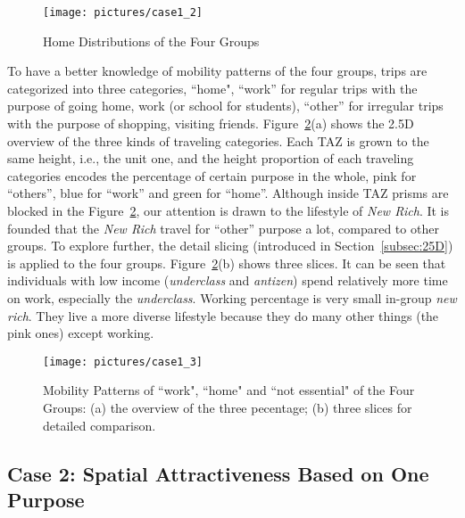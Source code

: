 \begin{figure}[htb!]
 \centering %
 \texttt{[image: pictures/case1\_2]}
 \caption{Home Distributions of the Four Groups}
 \label{case12}
\end{figure}

To have a better knowledge of mobility patterns of the four groups, trips are categorized into three categories, ``home", ``work'' for regular trips with the purpose of going home, work (or school for students), ``other'' for irregular trips with the purpose of shopping, visiting friends. Figure~\ref{case13}(a) shows the 2.5D overview of the three kinds of traveling categories. Each TAZ is grown to the same height, i.e., the unit one, and the height proportion of each traveling categories encodes the percentage of certain purpose in the whole, pink for ``others'', blue for ``work'' and green for ``home''. Although inside TAZ prisms are blocked in the Figure~\ref{case13}, our attention is drawn to the lifestyle of \textit{New Rich}. It is founded that the \textit{New Rich} travel for ``other'' purpose a lot, compared to other groups. To explore further, the detail slicing (introduced in Section~\ref{subsec:25D}) is applied to the four groups. Figure~\ref{case13}(b) shows three slices. It can be seen that individuals with low income (\textit{underclass} and \textit{antizen}) spend relatively more time on work, especially the \textit{underclass}. Working percentage is very small in-group \textit{new rich}. They live a more diverse lifestyle because they do many other things (the pink ones) except working.


\begin{figure}[htb!]
 \centering %
 \texttt{[image: pictures/case1\_3]}
 \caption{Mobility Patterns of ``work", ``home" and ``not essential" of the Four Groups: (a) the overview of the three pecentage; (b) three slices for detailed comparison.}
 \label{case13}
\end{figure}


\subsection{Case 2: Spatial Attractiveness Based on One Purpose}

